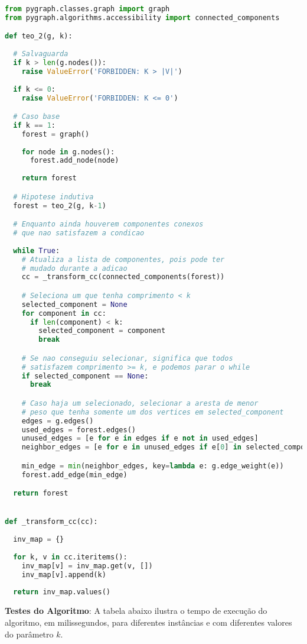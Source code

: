 \documentclass[paper=a4, fontsize=11pt]{scrartcl} %
\numberwithin{equation}{section} %
\numberwithin{figure}{section} %
\numberwithin{table}{section} %
\begin{document}
\begin{lstlisting}[language=Python, caption=Python algorithm]
from pygraph.classes.graph import graph
from pygraph.algorithms.accessibility import connected_components

def teo_2(g, k):
  
  # Salvaguarda
  if k > len(g.nodes()):
    raise ValueError('FORBIDDEN: K > |V|')
  
  if k <= 0:
    raise ValueError('FORBIDDEN: K <= 0')

  # Caso base
  if k == 1:
    forest = graph()
  
    for node in g.nodes():
      forest.add_node(node)
  
    return forest

  # Hipotese indutiva
  forest = teo_2(g, k-1)

  # Enquanto ainda houverem componentes conexos
  # que nao satisfazem a condicao
  
  while True:
    # Atualiza a lista de componentes, pois pode ter
    # mudado durante a adicao
    cc = _transform_cc(connected_components(forest))

    # Seleciona um que tenha comprimento < k
    selected_component = None
    for component in cc:
      if len(component) < k:
        selected_component = component
        break

    # Se nao conseguiu selecionar, significa que todos
    # satisfazem comprimento >= k, e podemos parar o while
    if selected_component == None:
      break

    # Caso haja um selecionado, selecionar a aresta de menor
    # peso que tenha somente um dos vertices em selected_component
    edges = g.edges()
    used_edges = forest.edges()
    unused_edges = [e for e in edges if e not in used_edges]
    neighbor_edges = [e for e in unused_edges if e[0] in selected_component]

    min_edge = min(neighbor_edges, key=lambda e: g.edge_weight(e))
    forest.add_edge(min_edge)

  return forest


def _transform_cc(cc):
  
  inv_map = {}
  
  for k, v in cc.iteritems():
    inv_map[v] = inv_map.get(v, [])
    inv_map[v].append(k)
  
  return inv_map.values()
\end{lstlisting}

\textbf{Testes do Algoritmo}: A tabela abaixo ilustra o tempo de execução do algoritmo, em milissegundos, para diferentes instâncias e com diferentes valores do parâmetro $k$. 
\end{document}
